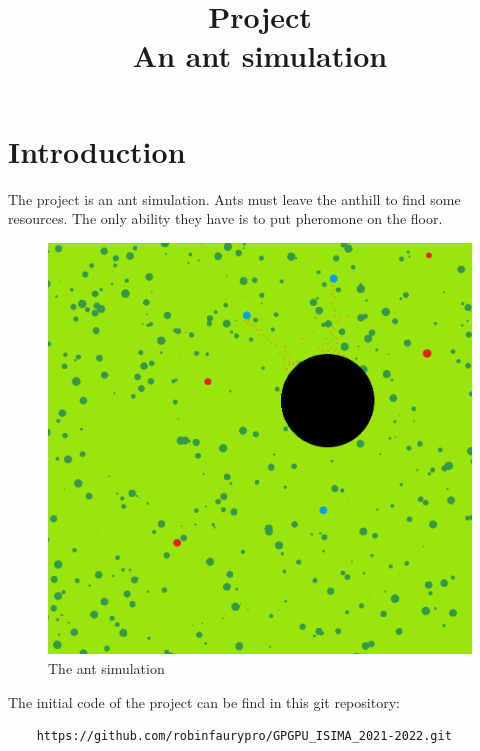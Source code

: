 \documentclass{article}
\begin{document}
\title{Project\\An ant simulation}
\maketitle

\section{Introduction}
The project is an ant simulation. Ants must leave the anthill to find some resources. The only ability they have is to put pheromone on the floor.
\begin{figure}[H]
	\centering
	\includegraphics[scale=0.5]{figures/ant.png}
	\caption{The ant simulation}
\end{figure}

The initial code of the project can be find in this git repository:
\begin{lstlisting}
	https://github.com/robinfaurypro/GPGPU_ISIMA_2021-2022.git
\end{lstlisting}
\end{document}
